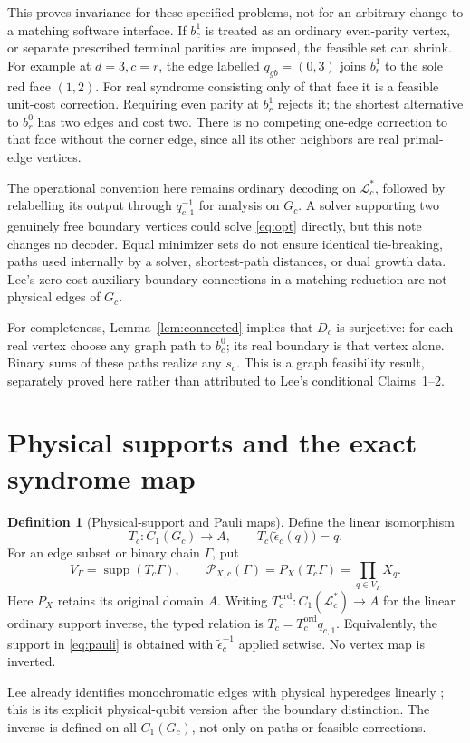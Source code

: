 \documentclass[11pt]{article}
\theoremstyle{definition}
\newtheorem{definition}{Definition}[section]
\theoremstyle{plain}
\theoremstyle{remark}
\newcommand{\LL}{\mathcal L}
\newcommand{\eps}{\epsilon}
\begin{document}
This proves invariance for these specified problems, not for an arbitrary
change to a matching software interface. If $b_c^1$ is treated as an
ordinary even-parity vertex, or separate prescribed terminal parities
are imposed, the feasible set can shrink. For example at $d=3,c=r$,
the edge labelled $q_{gb}=(0,3)$ joins $b_r^1$ to the sole red face
$(1,2)$. For real syndrome consisting only of that face it is a feasible
unit-cost correction. Requiring even parity at $b_r^1$ rejects it;
the shortest alternative to $b_r^0$ has two edges and cost two.
There is no competing one-edge correction to that face without the
corner edge, since all its other neighbors are real primal-edge vertices.

The operational convention here remains ordinary decoding on $\LL_c^*$,
followed by relabelling its output through $q_{c,1}^{-1}$ for analysis on
$G_c$. A solver supporting two genuinely free boundary vertices could
solve \eqref{eq:opt} directly, but this note changes no decoder.
Equal minimizer sets do not ensure identical tie-breaking, paths used
internally by a solver, shortest-path distances, or dual growth data.
Lee's zero-cost auxiliary boundary connections in a matching reduction
\cite[Sec.~2.2, footnote~1; Appendix~A.3]{Lee} are not physical edges
of $G_c$.

For completeness, Lemma~\ref{lem:connected} implies that $D_c$ is
surjective: for each real vertex choose any graph path to $b_c^0$;
its real boundary is that vertex alone. Binary sums of these paths
realize any $s_c$. This is a graph feasibility result, separately proved
here rather than attributed to Lee's conditional Claims~1--2.

\section{Physical supports and the exact syndrome map}
\label{sec:physicalmap}
\begin{definition}[Physical-support and Pauli maps]\label{def:physicalmap}
Define the linear isomorphism
\[
 T_c:C_1(G_c)\longrightarrow A,\qquad
 T_c\bigl(\widetilde\eps_c(q)\bigr)=q .
\]
For an edge subset or binary chain $\Gamma$, put
\begin{equation}
 V_\Gamma=\operatorname{supp}(T_c\Gamma),\qquad
 \mathscr P_{X,c}(\Gamma)=P_X(T_c\Gamma)=\prod_{q\in V_\Gamma}X_q .
                                                               \label{eq:pauli}
\end{equation}
Here $P_X$ retains its original domain $A$. Writing
$T_c^{\mathrm{ord}}:C_1(\LL_c^*)\to A$ for the linear ordinary
support inverse, the typed relation is $T_c=T_c^{\mathrm{ord}}q_{c,1}$.
Equivalently, the support in \eqref{eq:pauli} is obtained with
$\widetilde\eps_c^{-1}$ applied setwise. No vertex map is inverted.
\end{definition}
Lee already identifies monochromatic edges with physical hyperedges
linearly \cite[Appendix~A.1]{Lee}; this is its explicit physical-qubit
version after the boundary distinction. The inverse is defined on
all $C_1(G_c)$, not only on paths or feasible corrections.
\end{document}
